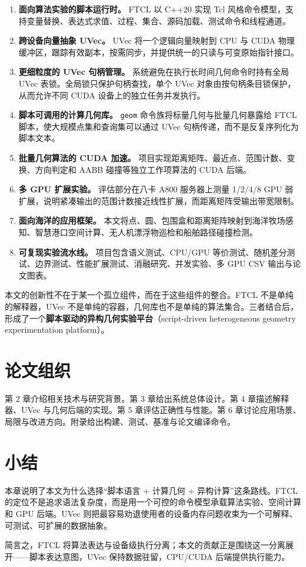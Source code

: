 \begin{enumerate}
  \item \textbf{面向算法实验的脚本运行时。} FTCL 以 C++20 实现 Tcl 风格命令模型，支持变量替换、表达式求值、过程、集合、源码加载、测试命令和线程通道。
  \item \textbf{跨设备向量抽象 UVec。} UVec 将一个逻辑向量映射到 CPU 与 CUDA 物理缓冲区，跟踪有效副本，按需同步，并提供统一的只读与可变原始指针接口。
  \item \textbf{更细粒度的 UVec 句柄管理。} 系统避免在执行长时间几何命令时持有全局 UVec 表锁。全局锁只保护句柄查找，单个 UVec 对象由按句柄条目锁保护，从而允许不同 CUDA 设备上的独立任务并发执行。
  \item \textbf{脚本可调用的计算几何库。} \texttt{geom} 命令族将标量几何与批量几何暴露给 FTCL 脚本，使大规模点集和查询集可以通过 UVec 句柄传递，而不是反复序列化为脚本文本。
  \item \textbf{批量几何算法的 CUDA 加速。} 项目实现距离矩阵、最近点、范围计数、变换、方向判定和 AABB 碰撞等独立工作项算法的 CUDA 后端。
  \item \textbf{多 GPU 扩展实验。} 评估部分在八卡 A800 服务器上测量 1/2/4/8 GPU 弱扩展，说明紧凑输出的范围计数接近线性扩展，而距离矩阵受输出带宽限制。
  \item \textbf{面向海洋的应用框架。} 本文将点、圆、包围盒和距离矩阵映射到海洋牧场感知、智慧港口空间计算、无人机漂浮物巡检和船舶路径碰撞检测。
  \item \textbf{可复现实验流水线。} 项目包含语义测试、CPU/GPU 等价测试、随机差分测试、边界测试、性能扩展测试、消融研究、并发实验、多 GPU CSV 输出与论文图表。
\end{enumerate}

本文的创新性不在于某一个孤立组件，而在于这些组件的整合。FTCL 不是单纯的解释器，UVec 不是单纯的容器，几何库也不是单纯的算法集合。三者结合后，形成了一个\textbf{脚本驱动的异构几何实验平台}（script-driven heterogeneous geometry experimentation platform）。

\section{论文组织}
第 2 章介绍相关技术与研究背景。第 3 章给出系统总体设计。第 4 章描述解释器、UVec 与几何后端的实现。第 5 章评估正确性与性能。第 6 章讨论应用场景、局限与改进方向。附录给出构建、测试、基准与论文编译命令。

\section{小结}
本章说明了本文为什么选择“脚本语言 + 计算几何 + 异构计算”这条路线。FTCL 的定位不是追求语法复杂度，而是用一个可控的命令模型承载算法实验、空间计算和 GPU 后端。UVec 则把最容易劝退使用者的设备内存问题收束为一个可解释、可测试、可扩展的数据抽象。

简言之，FTCL 将算法表达与设备级执行分离；本文的贡献正是围绕这一分离展开——脚本表达意图，UVec 保持数据驻留，CPU/CUDA 后端提供执行能力。
